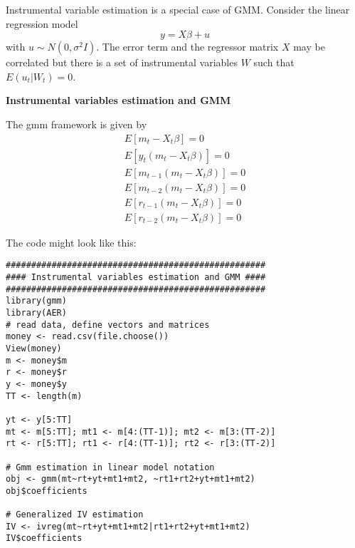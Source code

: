 \documentclass{article}
\begin{document}
Instrumental variable estimation is a special case of GMM. Consider the
linear regression model%
\begin{equation*}
y=X\beta +u
\end{equation*}%
with $u\sim N(0,\sigma ^{2}I)$. The error term and the regressor matrix $X$
may be correlated but there is a set of instrumental variables $W$ such that
$E(u_{t}|W_{t})=0$.


\begin{solution}
\textbf{Instrumental variables estimation and GMM }

The gmm framework is given by
\begin{align*}
  E[m_t -X_t\beta] = 0\\
  E[y_t(m_t -X_t\beta)] = 0\\
  E[m_{t-1}(m_t -X_t\beta)] = 0\\
  E[m_{t-2}(m_t -X_t\beta)] = 0\\
  E[r_{t-1}(m_t -X_t\beta)] = 0\\
  E[r_{t-2}(m_t -X_t\beta)] = 0
\end{align*}

 The code might look like this:
\begin{verbatim}
###################################################
#### Instrumental variables estimation and GMM ####
###################################################
library(gmm)
library(AER)
# read data, define vectors and matrices
money <- read.csv(file.choose())
View(money)
m <- money$m
r <- money$r
y <- money$y
TT <- length(m)

yt <- y[5:TT]
mt <- m[5:TT]; mt1 <- m[4:(TT-1)]; mt2 <- m[3:(TT-2)]
rt <- r[5:TT]; rt1 <- r[4:(TT-1)]; rt2 <- r[3:(TT-2)]

# Gmm estimation in linear model notation
obj <- gmm(mt~rt+yt+mt1+mt2, ~rt1+rt2+yt+mt1+mt2)
obj$coefficients

# Generalized IV estimation
IV <- ivreg(mt~rt+yt+mt1+mt2|rt1+rt2+yt+mt1+mt2)
IV$coefficients
\end{verbatim}
\end{solution}
\end{document}

